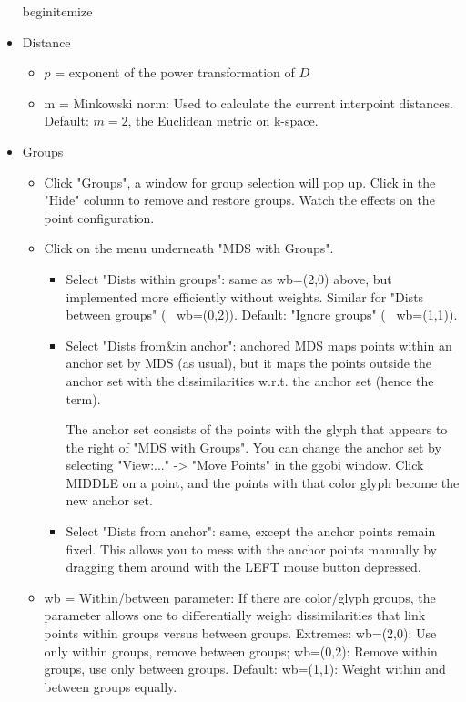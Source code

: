 \documentclass[11pt]{article}
\begin{document}
\begin{itemize}
begin{itemize}

\item Distance
\begin{itemize}
\item
$p$ = exponent of the power transformation of $D$
\item
m = Minkowski norm: Used to calculate the current interpoint distances.
    Default: $m=2$, the Euclidean metric on k-space.
\end{itemize}


\item Groups

  \begin{itemize}
  \item
    Click "Groups", a window for group selection will pop up.  Click
    in the "Hide" column to remove and restore groups.  Watch the
    effects on the point configuration.
  \item
    Click on the menu underneath "MDS with Groups".  
    \begin{itemize}
    \item
    Select "Dists within groups": same as wb=(2,0) above, but
    implemented more efficiently without weights.
    Similar for "Dists between groups" (~ wb=(0,2)).
    Default: "Ignore groups" (~ wb=(1,1)).
    \item
    Select "Dists from\&in anchor": anchored MDS maps points within an
    anchor set by MDS (as usual), but it maps the points outside the
    anchor set with the dissimilarities w.r.t. the anchor set (hence
    the term).

    The anchor set consists of the points with the glyph that appears
    to the right of "MDS with Groups".  You can change the anchor set
    by selecting "View:..." -> "Move Points" in the ggobi window.
    Click MIDDLE on a point, and the points with that color glyph
    become the new anchor set.
    \item
    Select "Dists from anchor": same, except the anchor points remain
    fixed.  This allows you to mess with the anchor points manually by
    dragging them around with the LEFT mouse button depressed.
    \end{itemize}
\item
wb = Within/between parameter: If there are color/glyph groups, the
    parameter allows one to differentially weight dissimilarities that
    link points within groups versus between groups.  
    Extremes: wb=(2,0): Use only within groups, remove between groups;
              wb=(0,2): Remove within groups, use only between groups.
    Default:  wb=(1,1): Weight within and between groups equally.    


\end{itemize}
\end{itemize}
\end{document}

